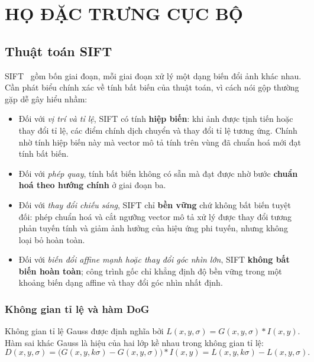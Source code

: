 \documentclass[12pt,a4paper]{article}
\numberwithin{equation}{section}
\begin{document}
\section{HỌ ĐẶC TRƯNG CỤC BỘ}

\subsection{Thuật toán SIFT}

SIFT~\cite{lowe2004} gồm bốn giai đoạn, mỗi giai đoạn xử lý một dạng biến đổi ảnh khác nhau. Cần
phát biểu chính xác về tính bất biến của thuật toán, vì cách nói gộp thường gặp dễ gây hiểu nhầm:

\begin{itemize}
  \item Đối với \textit{vị trí và tỉ lệ}, SIFT có tính \textbf{hiệp biến}: khi ảnh được tịnh tiến
  hoặc thay đổi tỉ lệ, các điểm chính dịch chuyển và thay đổi tỉ lệ tương ứng. Chính nhờ tính hiệp
  biến này mà vector mô tả tính trên vùng đã chuẩn hoá mới đạt tính bất biến.
  \item Đối với \textit{phép quay}, tính bất biến không có sẵn mà đạt được nhờ bước
  \textbf{chuẩn hoá theo hướng chính} ở giai đoạn ba.
  \item Đối với \textit{thay đổi chiếu sáng}, SIFT chỉ \textbf{bền vững} chứ không bất biến tuyệt
  đối: phép chuẩn hoá và cắt ngưỡng vector mô tả xử lý được thay đổi tương phản tuyến tính và giảm
  ảnh hưởng của hiệu ứng phi tuyến, nhưng không loại bỏ hoàn toàn.
  \item Đối với \textit{biến đổi affine mạnh hoặc thay đổi góc nhìn lớn}, SIFT \textbf{không bất
  biến hoàn toàn}; công trình gốc chỉ khẳng định độ bền vững trong một khoảng biến dạng affine và
  thay đổi góc nhìn nhất định.
\end{itemize}

\subsubsection{Không gian tỉ lệ và hàm DoG}

Không gian tỉ lệ Gauss được định nghĩa bởi $L(x,y,\sigma) = G(x,y,\sigma) * I(x,y)$. Hàm sai khác
Gauss là hiệu của hai lớp kề nhau trong không gian tỉ lệ:
\begin{equation}
D(x,y,\sigma) = \big(G(x,y,k\sigma) - G(x,y,\sigma)\big) * I(x,y) = L(x,y,k\sigma) - L(x,y,\sigma).
\end{equation}
\end{document}
